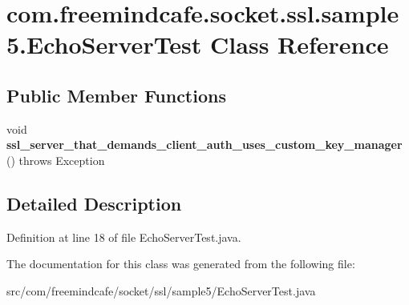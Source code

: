\hypertarget{classcom_1_1freemindcafe_1_1socket_1_1ssl_1_1sample5_1_1_echo_server_test}{}\section{com.\+freemindcafe.\+socket.\+ssl.\+sample5.\+Echo\+Server\+Test Class Reference}
\label{classcom_1_1freemindcafe_1_1socket_1_1ssl_1_1sample5_1_1_echo_server_test}
\subsection*{Public Member Functions}
\begin{DoxyCompactItemize}
\item 
\hypertarget{classcom_1_1freemindcafe_1_1socket_1_1ssl_1_1sample5_1_1_echo_server_test_ac35c4111221ea93000f63253bc8a6af6}{}void {\bfseries ssl\+\_\+server\+\_\+that\+\_\+demands\+\_\+client\+\_\+auth\+\_\+uses\+\_\+custom\+\_\+key\+\_\+manager} ()  throws Exception\label{classcom_1_1freemindcafe_1_1socket_1_1ssl_1_1sample5_1_1_echo_server_test_ac35c4111221ea93000f63253bc8a6af6}

\end{DoxyCompactItemize}


\subsection{Detailed Description}


Definition at line 18 of file Echo\+Server\+Test.\+java.



The documentation for this class was generated from the following file\+:\begin{DoxyCompactItemize}
\item 
src/com/freemindcafe/socket/ssl/sample5/Echo\+Server\+Test.\+java\end{DoxyCompactItemize}
